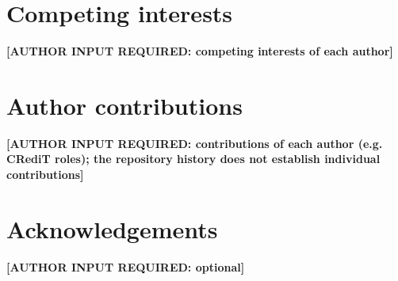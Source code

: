 \documentclass[11pt,a4paper]{article}
\newcommand{\authorinput}[1]{\textcolor{red!70!black}{\textbf{[AUTHOR INPUT REQUIRED: #1]}}}
\begin{document}
\section*{Competing interests}
\authorinput{competing interests of each author}

\section*{Author contributions}
\authorinput{contributions of each author (e.g. CRediT roles); the repository
history does not establish individual contributions}

\section*{Acknowledgements}
\authorinput{optional}



\end{document}
